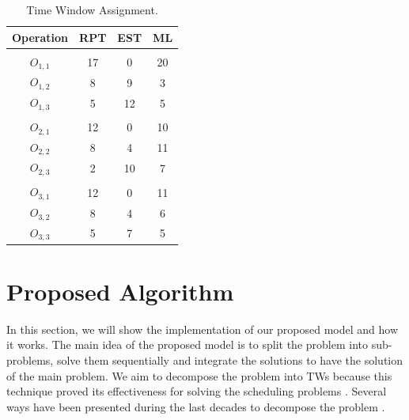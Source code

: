 \documentclass[runningheads]{llncs}
\begin{document}
\begin{table}[h!]
\fontsize{12}{9}
\setlength{\tabcolsep}{10.0pt}
\centering
  \begin{center}
  \caption{Time Window Assignment.}
  \label{tab3}
    \begin{tabular}{c  c  c  c}
      \textbf{Operation} & \textbf{RPT} & \textbf{EST} & \textbf{ML}\\
      \hline
										\\
      $O_{1,1}$  & 17 & 0   & 20	\\
      $O_{1,2}$  & 8  & 9   & 3		\\
      $O_{1,3}$  & 5  & 12 & 5		\\
										\\
      $O_{2,1}$  & 12 & 0   & 10	\\
      $O_{2,2}$  & 8  & 4   & 11	\\
      $O_{2,3}$  & 2  & 10 & 7		\\
					    					\\
      $O_{3,1}$  & 12 & 0  & 11	\\
      $O_{3,2}$  & 8  & 4  & 6		\\
      $O_{3,3}$  & 5  & 7  & 5		\\
    \end{tabular}

  \end{center} 
\end{table}

\section{Proposed Algorithm}
\label{sec:method}
In this section, we will show the implementation of our proposed model and how it works. The main idea of the proposed model is to split the problem into sub-problems, solve them sequentially and integrate the solutions to have the solution of the main problem. We aim to decompose the problem into TWs because this technique proved its effectiveness for solving the scheduling problems \cite{zhang2010hybrid,zhai2014decomposition}. Several ways have been presented during the last decades to decompose the problem \cite{zhai2014decomposition,singer2001decomposition,ovacik2012decomposition,uzsoy2000performance}.\\ 
\end{document}
